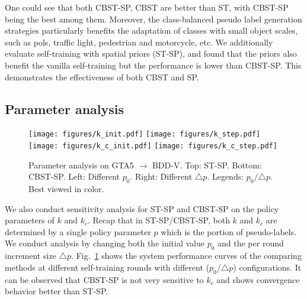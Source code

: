 \documentclass[runningheads]{llncs}
\begin{document}
One could see that both CBST-SP, CBST are better than ST, with CBST-SP being the best among them. Moreover, the class-balanced pseudo label generation strategies particularly benefits the adaptation of classes with small object scales, such as pols, traffic light, pedestrian and motorcycle, etc. We additionally evaluate self-training with spatial priors (ST-SP), and found that the priors also benefit the vanilla self-training but the performance is lower than CBST-SP. This demonstrates the effectiveness of both CBST and SP.

\subsection{Parameter analysis}
\begin{figure}[t]
\centering
\texttt{[image: figures/k\_init.pdf]}
\texttt{[image: figures/k\_step.pdf]}\\
\texttt{[image: figures/k\_c\_init.pdf]}
\texttt{[image: figures/k\_c\_step.pdf]}
\caption{Parameter analysis on GTA5 $\rightarrow$ BDD-V. Top: ST-SP. Bottom: CBST-SP. Left: Different $p_0$. Right: Different $\triangle p$. Legends: $p_0/\triangle p$. Best viewed in color.}\label{gtabddv_as}
\end{figure}

We also conduct sensitivity analysis for ST-SP and CBST-SP on the policy parameters of $k$ and $k_c$. Recap that in ST-SP/CBST-SP, both $k$ and $k_c$ are determined by a single policy parameter $p$ which is the portion of pseudo-labels. We conduct analysis by changing both the initial value $p_0$ and the per round increment size $\triangle p$. Fig.~\ref{gtabddv_as} shows the system performance curves of the comparing methods at different self-training rounds with different ($p_0$/$\triangle p$) configurations. It can be observed that CBST-SP is not very sensitive to $k_c$ and shows convergence behavior better than ST-SP.
\end{document}
